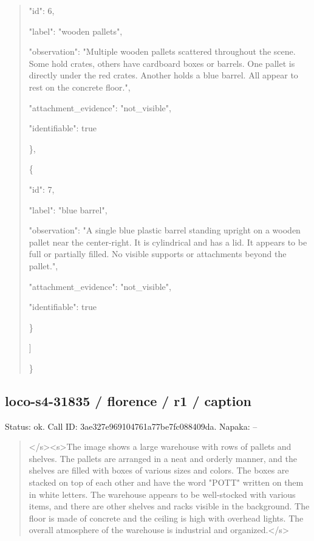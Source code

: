 \documentclass[10pt,a4paper]{article}
\begin{document}
\begin{quote}
      "id":\allowbreak{} 6,\allowbreak{}\par
      "label":\allowbreak{} "wooden pallets",\allowbreak{}\par
      "observation":\allowbreak{} "Multiple wooden pallets scattered throughout the scene. Some hold crates,\allowbreak{} others have cardboard boxes or barrels. One pallet is directly under the red crates. Another holds a blue barrel. All appear to rest on the concrete floor.",\allowbreak{}\par
      "attachment\_evidence":\allowbreak{} "not\_visible",\allowbreak{}\par
      "identifiable":\allowbreak{} true\par
    \},\allowbreak{}\par
    \{\par
      "id":\allowbreak{} 7,\allowbreak{}\par
      "label":\allowbreak{} "blue barrel",\allowbreak{}\par
      "observation":\allowbreak{} "A single blue plastic barrel standing upright on a wooden pallet near the center-right. It is cylindrical and has a lid. It appears to be full or partially filled. No visible supports or attachments beyond the pallet.",\allowbreak{}\par
      "attachment\_evidence":\allowbreak{} "not\_visible",\allowbreak{}\par
      "identifiable":\allowbreak{} true\par
    \}\par
  ]\par
\}
\end{quote}
\subsection*{loco-s4-31835 / florence / r1 / caption}
Status: ok. Call ID: 3ae327e969104761a77be7fc088409da. Napaka: --
\begin{quote}\footnotesize
</s>\allowbreak{}<s>\allowbreak{}The image shows a large warehouse with rows of pallets and shelves. The pallets are arranged in a neat and orderly manner,\allowbreak{} and the shelves are filled with boxes of various sizes and colors. The boxes are stacked on top of each other and have the word "POTT" written on them in white letters. The warehouse appears to be well-stocked with various items,\allowbreak{} and there are other shelves and racks visible in the background. The floor is made of concrete and the ceiling is high with overhead lights. The overall atmosphere of the warehouse is industrial and organized.</s>\allowbreak{}
\end{quote}
\end{document}
